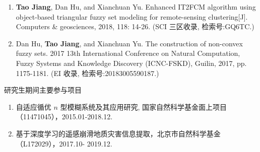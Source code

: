 \begin{paper}
\begin{enumerate}
  \item \textbf{Tao Jiang}, Dan Hu, and Xianchuan Yu.  Enhanced IT2FCM algorithm using object-based triangular fuzzy set modeling for remote-sensing clustering[J]. Computers \& geosciences, 2018, 118: 14-26. (SCI 三区收录, 检索号:GQ6TC.)
  \item Dan Hu, \textbf{Tao Jiang}, and Xianchuan Yu. The construction of non-convex fuzzy sets. 2017 13th International Conference on Natural Computation, Fuzzy Systems and Knowledge  Discovery (ICNC-FSKD), Guilin, 2017, pp. 1175-1181. (EI 收录, 检索号:20183005590187.)\\
  \end{enumerate}

\end{paper}





\begin{center}
  \large 研究生期间主要参与项目
\end{center}

\begin{enumerate}[(1)]
\item 自适应循优 $n$ 型模糊系统及其应用研究, 国家自然科学基金面上项目（11471045），2015.01-2018.12.

\item 基于深度学习的遥感崩滑地质灾害信息提取，北京市自然科学基金（L172029），2017.10-
2019.12.\\

\end{enumerate}

